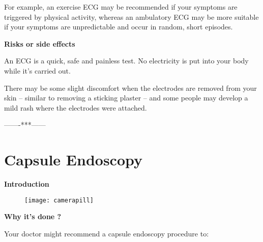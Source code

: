 \documentclass[12pt]{article}
\begin{document}
For example, an exercise ECG may be recommended if your symptoms are triggered by physical activity, whereas an ambulatory ECG may be more suitable if your symptoms are unpredictable and occur in random, short episodes.




\LARGE\flushleft\textbf{Risks or side effects}

\large\flushleft An ECG is a quick, safe and painless test. No electricity is put into your body while it's carried out.

There may be some slight discomfort when the electrodes are removed from your skin – similar to removing a sticking plaster – and some people may develop a mild rash where the electrodes were attached.


\vspace{1.5cm}

\centering\huge-------***------




\pagebreak


\section{\centering\Huge\textbf{Capsule Endoscopy}}


\vspace{0.5cm}


\LARGE\flushleft\textbf{Introduction}

\vspace{0.2cm}
\Large{}

\begin{figure}[h]
\centering
\texttt{[image: camerapill]}
\end{figure}
\LARGE\flushleft\textbf{Why it's done ?}

\large\flushleft Your doctor might recommend a capsule endoscopy procedure to:
\end{document}
